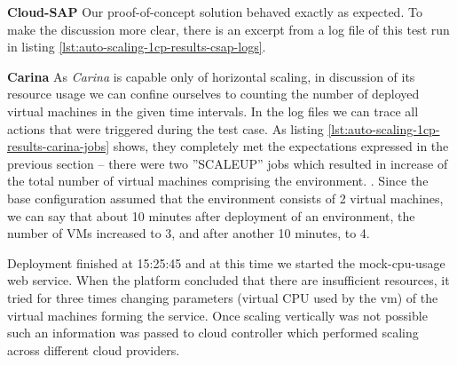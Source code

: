 \begin{asparaenum}

  \item[\textbf{Cloud-SAP}] Our proof-of-concept solution behaved exactly as expected. To make the discussion more clear, there is an excerpt from a log file of this test run in listing \ref{lst:auto-scaling-1cp-results-csap-logs}. 


\item[\textbf{Carina}] As \emph{Carina} is capable only of horizontal scaling, in discussion of its resource usage we can confine ourselves to counting the number of deployed virtual machines in the given time intervals. In the log files we can trace all actions that were triggered during the test case. As listing \ref{lst:auto-scaling-1cp-results-carina-jobs} shows, they completely met the expectations expressed in the previous section -- there were two ''SCALEUP'' jobs which resulted in increase of the total number of virtual machines comprising the environment.  . Since the base configuration assumed that the environment consists of 2 virtual machines, we can say that about 10 minutes after deployment of an environment, the number of VMs increased to 3, and after another 10 minutes, to 4.

Deployment finished at 15:25:45 and at this time we started the mock-cpu-usage web service. When the platform concluded that there are insufficient resources, it tried for three times changing parameters (virtual CPU used by the vm) of the virtual machines forming the service. Once scaling vertically was not possible such an information was passed to cloud controller which performed scaling across different cloud providers.
\end{asparaenum}

